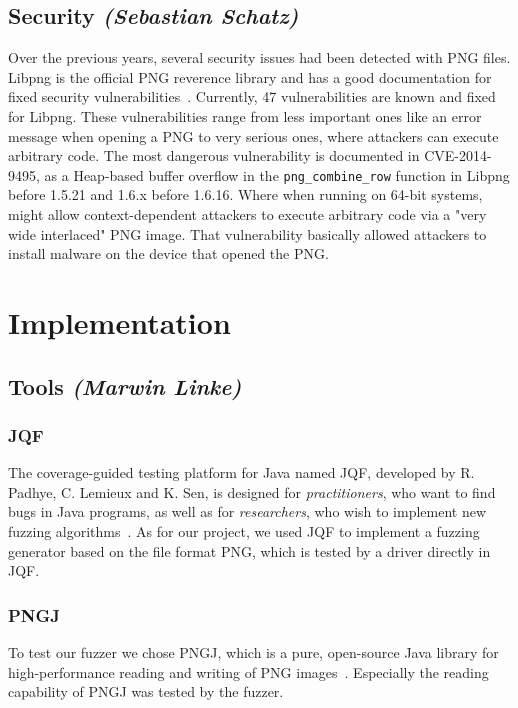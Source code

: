 \documentclass[runningheads]{llncs}
\begin{document}
\subsection{Security  \normalfont\textit{(Sebastian Schatz)}}
Over the previous years, several security issues had been detected with PNG files.
Libpng is the official PNG reverence library and has a good documentation for fixed
security vulnerabilities~\cite{security}. Currently, 47 vulnerabilities are known and fixed for Libpng.
These vulnerabilities range from less important ones like an error message when
opening a PNG to very serious ones, where attackers can execute arbitrary code. The
most dangerous vulnerability is documented in CVE-2014-9495, as a Heap-based
buffer overflow in the \texttt{png\_combine\_row} function in Libpng before 1.5.21 and 1.6.x
before 1.6.16. Where when running on 64-bit systems, might allow context-dependent attackers to execute arbitrary code via a "very wide interlaced" PNG
image. That vulnerability basically allowed attackers to install malware on the device
that opened the PNG.

\section{Implementation}
\subsection{Tools \normalfont\textit{(Marwin Linke)}}
\subsubsection{JQF}
The coverage-guided testing platform for Java named JQF, developed by R. Padhye, C. Lemieux and K. Sen, is designed for \textit{practitioners}, who want to find bugs in Java programs, as well as for \textit{researchers}, who wish to implement new fuzzing algorithms~\cite{JQF_paper}. As for our project, we used JQF to implement a fuzzing generator based on the file format PNG, which is tested by a driver directly in JQF.
\subsubsection{PNGJ}
To test our fuzzer we chose PNGJ, which is a pure, open-source Java library for high-performance reading and writing of PNG images~\cite{PNGJ_github}. Especially the reading capability of PNGJ was tested by the fuzzer.
\end{document}
